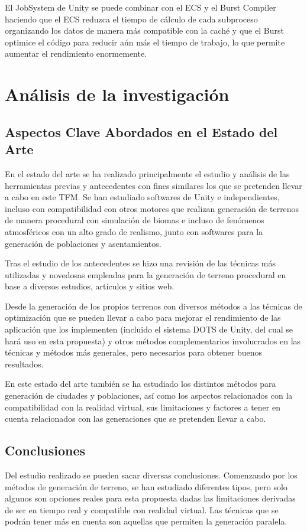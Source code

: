             
            El JobSystem de Unity se puede combinar con el ECS y el Burst Compiler haciendo que el ECS reduzca el tiempo de cálculo de cada subproceso organizando los datos de manera más compatible con la caché y que el Burst optimice el código para reducir aún más el tiempo de trabajo, lo que permite aumentar el rendimiento enormemente. \cite {unityblog}
           

\section{Análisis de la investigación}
    \subsection{Aspectos Clave Abordados en el Estado del Arte}
    En el estado del arte se ha realizado principalmente el estudio y análisis de las herramientas previas y antecedentes con fines similares los que se pretenden llevar a cabo en este TFM. Se han estudiado softwares de Unity e independientes, incluso con compatibilidad con otros motores que realizan generación de terrenos de manera procedural con simulación de biomas e incluso de fenómenos atmosféricos con un alto grado de realismo, junto con softwares para la generación de poblaciones y asentamientos.
    
    Tras el estudio de los antecedentes se hizo una revisión de las técnicas más utilizadas y novedosas empleadas para la generación de terreno procedural en base a diversos estudios, artículos y sitios web. 
    
    Desde la generación de los propios terrenos con diversos métodos a las técnicas de optimización que se pueden llevar a cabo para mejorar el rendimiento de las aplicación que los implementen (incluido el sistema DOTS de Unity, del cual se hará uso en esta propuesta) y otros métodos complementarios involucrados en las técnicas y métodos más generales, pero necesarios para obtener buenos resultados. 
    
    En este estado del arte también se ha estudiado los distintos métodos para generación de ciudades y poblaciones, así como los aspectos relacionados con la compatibilidad con la realidad virtual, sus limitaciones y factores a tener en cuenta relacionados con las generaciones que se pretenden llevar a cabo.
    
    \subsection{Conclusiones}
    Del estudio realizado se pueden sacar diversas conclusiones. Comenzando por los métodos de generación de terreno, se han estudiado diferentes tipos, pero solo algunos son opciones reales para esta propuesta dadas las limitaciones derivadas de ser en tiempo real y compatible con realidad virtual. Las técnicas que se podrán tener más en cuenta son aquellas que permiten la generación paralela. 
    
